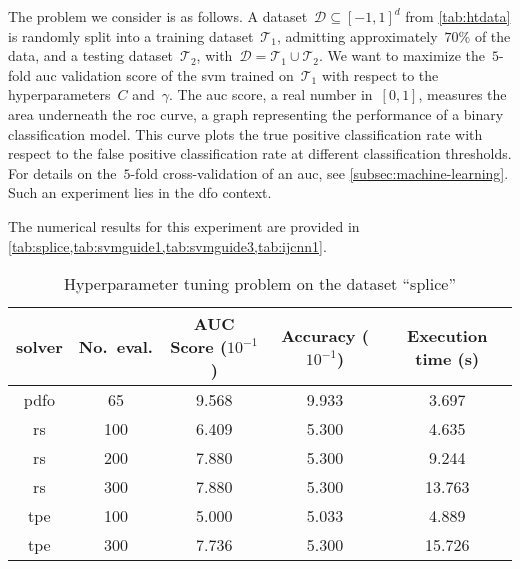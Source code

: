 The problem we consider is as follows.
A dataset~$\mathcal{D} \subseteq [-1, 1]^d$ from \cref{tab:htdata} is randomly split into a training dataset~$\mathcal{T}_1$, admitting approximately~$70\%$ of the data, and a testing dataset~$\mathcal{T}_2$, with~$\mathcal{D} = \mathcal{T}_1 \cup \mathcal{T}_2$.
We want to maximize the~$5$-fold \gls{auc} validation score of the \gls{svm} trained on~$\mathcal{T}_1$ with respect to the hyperparameters~$C$ and~$\gamma$.
The \gls{auc} score, a real number in~$[0, 1]$, measures the area underneath the \gls{roc} curve, a graph representing the performance of a binary classification model.
This curve plots the true positive classification rate with respect to the false positive classification rate at different classification thresholds.
For details on the~$5$-fold cross-validation of an \gls{auc}, see \cref{subsec:machine-learning}.
Such an experiment lies in the \gls{dfo} context.

The numerical results for this experiment are provided in \cref{tab:splice,tab:svmguide1,tab:svmguide3,tab:ijcnn1}.

\begin{table}[!ht]
    \caption{Hyperparameter tuning problem on the dataset \enquote{splice}}
    \label{tab:splice}
    \centering
    \begin{tabular}{cS[table-parse-only]SSS}
        \toprule
        solver      & {No.\ eval.}  & {AUC Score ($10^{-1}$)}   & {Accuracy ($10^{-1}$)}    & {Execution time (\si{\second})}\\
        \midrule
        \gls{pdfo}  & 65            & 9.568                     & 9.933                     & 3.697\\
        \gls{rs}    & 100           & 6.409                     & 5.300                     & 4.635\\
        \gls{rs}    & 200           & 7.880                     & 5.300                     & 9.244\\
        \gls{rs}    & 300           & 7.880                     & 5.300                     & 13.763\\
        \gls{tpe}   & 100           & 5.000                     & 5.033                     & 4.889\\
        \gls{tpe}   & 300           & 7.736                     & 5.300                     & 15.726\\
        \bottomrule
    \end{tabular}
\end{table}

